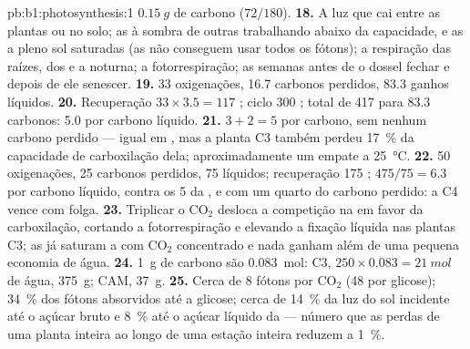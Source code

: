\begin{solution}{pb:b1:photosynthesis:1}
$\qty{0.15}{g}$ de carbono ($72/180$).
\textbf{18.} A luz que cai entre as plantas ou no solo; as  à
sombra de outras  trabalhando abaixo da capacidade, e as  a
pleno sol saturadas (as  não conseguem usar todos os fótons); a
respiração das raízes, dos  e a noturna; a fotorrespiração; as
semanas antes de o dossel fechar e depois de ele senescer.
\textbf{19.} 33 oxigenações, 16.7 carbonos perdidos, 83.3 ganhos
líquidos.
\textbf{20.} Recuperação $33\times 3.5 = 117$ ; ciclo 300 ; total
de 417  para 83.3 carbonos: 5.0  por carbono líquido.
\textbf{21.} $3 + 2 = 5$  por carbono, sem nenhum carbono perdido ---
igual em , mas a planta C3 também perdeu \qty{17}{\%} da capacidade
de carboxilação dela; aproximadamente um empate a \qty{25}{\celsius}.
\textbf{22.} 50 oxigenações, 25 carbonos perdidos, 75 líquidos;
recuperação 175 ; $475/75 = 6.3$  por carbono líquido, contra os 5
da , e com um quarto do carbono perdido: a C4 vence com folga.
\textbf{23.} Triplicar o $\mathrm{CO_2}$ desloca a competição na 
em favor da carboxilação, cortando a fotorrespiração e elevando a
fixação líquida nas plantas C3; as  já saturam a  com
$\mathrm{CO_2}$ concentrado e nada ganham além de uma pequena economia
de água.
\textbf{24.} \qty{1}{g} de carbono são \qty{0.083}{mol}: C3, $250\times 0.083 = \qty{21}{mol}$ de água, \qty{375}{g}; CAM, \qty{37}{g}.
\textbf{25.} Cerca de 8 fótons por $\mathrm{CO_2}$ (48 por glicose);
\qty{34}{\%} dos fótons absorvidos até a glicose; cerca de \qty{14}{\%}
da luz do sol incidente até o açúcar bruto e \qty{8}{\%} até o açúcar
líquido da  --- número que as perdas de uma planta inteira ao longo
de uma estação inteira reduzem a \qty{1}{\%}.
\end{solution}

